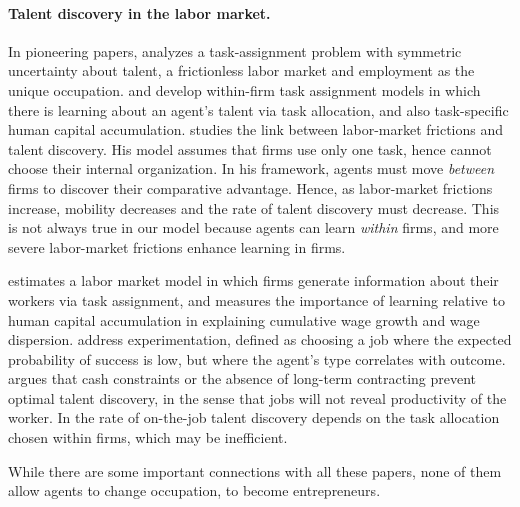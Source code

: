 \documentclass[12pt,american]{paper}
\theoremstyle{remark}
\begin{document}
\paragraph{Talent discovery in the labor market.} 
In pioneering papers, \citet{macdonald1982information,macdonald1982market} analyzes a task-assignment problem with symmetric uncertainty about talent, a frictionless labor market and employment as the unique occupation. \citet{gibbons1999theory} and \citet{gibbons2004task} develop within-firm task assignment models in which there is learning about an agent's talent via task allocation, and also task-specific human capital accumulation. \citet*{papageorgiou_learning_2010} studies the link between labor-market frictions and talent discovery. His model assumes that firms use only one task, hence cannot choose their internal organization. In his framework, agents must move \textit{between} firms to discover their comparative advantage. Hence, as labor-market frictions increase, mobility decreases and the rate of talent discovery must decrease. This is not always true in our model because agents can learn \textit{within} firms, and more severe labor-market frictions enhance learning in firms.


\citet{pastorino2013careers} estimates a labor market model in which firms generate information about their workers via task assignment, and measures the importance of learning relative to human capital accumulation in explaining cumulative wage growth and wage dispersion. \citet*{antonovics_experimentation_2010} address experimentation, defined as choosing a job where the expected probability of success is low, but where the agent's type correlates with outcome. \citet{tervio_superstars_2009} argues that cash constraints or the absence of long-term contracting prevent optimal talent discovery, in the sense that jobs will not reveal productivity of the worker. In \cite{canidio2013rewarding} the rate of on-the-job talent discovery depends on the task allocation chosen within firms, which may be inefficient.

While there are some important connections with all these papers, none of them allow agents to change occupation, to become entrepreneurs.

\end{document}
